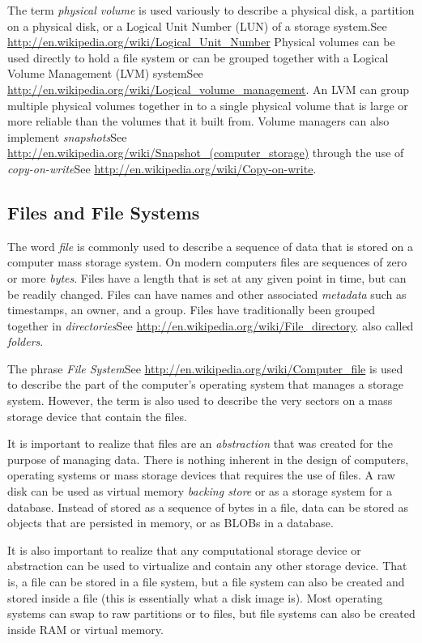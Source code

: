 \documentclass[11pt,letter]{book}
\newcommand{\wikipedia}[1]{See \url{#1}}
\begin{document}
The term \emph{physical volume} is used variously to describe a
physical disk, a partition on a physical disk, or a Logical Unit
Number (LUN) of a storage
system.\wikipedia{http://en.wikipedia.org/wiki/Logical_Unit_Number}
Physical volumes can be used directly to hold a file system or can be
grouped together with a Logical Volume Management (LVM)
system\wikipedia{http://en.wikipedia.org/wiki/Logical_volume_management}. An
LVM can group multiple physical volumes together in to a single
physical volume that is large or more reliable than the volumes that
it built from. Volume managers can also implement
\emph{snapshots}\wikipedia{http://en.wikipedia.org/wiki/Snapshot_(computer_storage)}
through the use of
\emph{copy-on-write}\wikipedia{http://en.wikipedia.org/wiki/Copy-on-write}.

\subsection{Files and File Systems}
The word \emph{file} is commonly used to describe a sequence of data
that is stored on a computer mass storage system. On modern computers
files are sequences of zero or more \emph{bytes}. Files have a length
that is set at any given point in time, but can be readily
changed. Files can have names and other associated \emph{metadata}
such as timestamps, an owner, and a group. Files have traditionally
been grouped together in
\emph{directories}\wikipedia{http://en.wikipedia.org/wiki/File_directory}. also
called \emph{folders}. 

The phrase \emph{File
  System}\wikipedia{http://en.wikipedia.org/wiki/Computer_file} is
used to describe the part of the computer's operating
system that manages a storage system. However, the term is also used
to describe the very sectors on a mass storage device that contain the
files.

It is important to realize that files are an \emph{abstraction} that
was created for the purpose of managing data. There is nothing
inherent in the design of computers, operating systems or mass storage
devices that requires the use of files. A raw disk can be used as
virtual memory \emph{backing store} or as a storage system for a
database. Instead of stored as a sequence of bytes in a file, data can be stored as
objects that are persisted in memory, or as BLOBs in a database.

It is also important to realize that any computational storage device
or abstraction can be used to virtualize and contain any other storage
device. That is, a file can be stored in a file system, but a file
system can also be created and stored inside a file (this is
essentially what a disk image is). Most operating systems can swap to raw
partitions or to files, but file systems can also be created inside
RAM or virtual memory.
\end{document}
